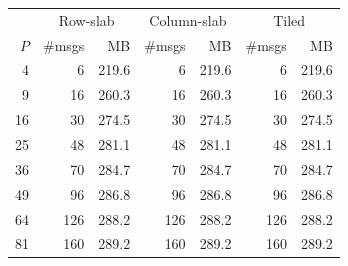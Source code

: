 \begin{tabular}{r|rr|rr|rr}
\hline
 & \multicolumn{2}{c|}{Row-slab} & \multicolumn{2}{c|}{Column-slab} & \multicolumn{2}{c}{Tiled} \\
$P$ & \#msgs & MB & \#msgs & MB & \#msgs & MB \\
\hline
4 & 6 & 219.6 & 6 & 219.6 & 6 & 219.6 \\
9 & 16 & 260.3 & 16 & 260.3 & 16 & 260.3 \\
16 & 30 & 274.5 & 30 & 274.5 & 30 & 274.5 \\
25 & 48 & 281.1 & 48 & 281.1 & 48 & 281.1 \\
36 & 70 & 284.7 & 70 & 284.7 & 70 & 284.7 \\
49 & 96 & 286.8 & 96 & 286.8 & 96 & 286.8 \\
64 & 126 & 288.2 & 126 & 288.2 & 126 & 288.2 \\
81 & 160 & 289.2 & 160 & 289.2 & 160 & 289.2 \\
\hline
\end{tabular}
